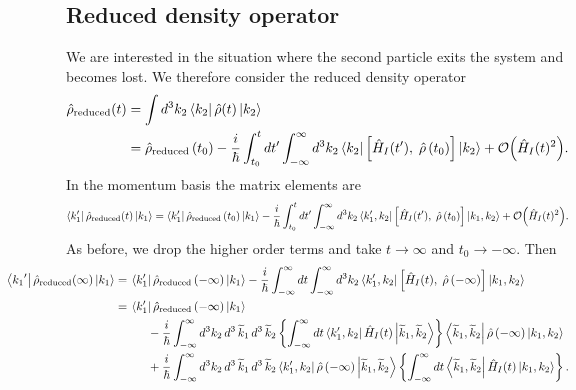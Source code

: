 \subsection{Reduced density operator}

We are interested in the situation where the second particle exits the system and becomes lost. We therefore consider the reduced density operator
\begin{align*}
\hat{\rho}_\text{reduced}(t) &= \int d^3k_2 \left\langle k_2\right| \hat{\rho}(t) \left|k_2\right\rangle \nonumber\\
&= \hat{\rho}_\text{reduced}\left(t_0\right) -  \frac{i}{\hbar} \int_{t_0}^tdt^\prime\int_{-\infty}^\infty d^3k_2\left\langle k_2\right|\left[\hat{H}_I(t^\prime),\; \hat{\rho}\left(t_0\right)\right]\left|k_2\right\rangle + \mathcal{O}{\left(\hat{H}_I(t)^2\right)}.
\end{align*}
In the momentum basis the matrix elements are
\[
\left\langle k_1^\prime\right|\hat{\rho}_\text{reduced}(t)\left|k_1\right\rangle = \left\langle k_1^\prime\right|\hat{\rho}_\text{reduced}\left(t_0\right)\left|k_1\right\rangle -  \frac{i}{\hbar} \int_{t_0}^tdt^\prime\int_{-\infty}^\infty d^3k_2 \left\langle k_1^\prime, k_2\right|\left[\hat{H}_I(t^\prime),\; \hat{\rho}\left(t_0\right)\right]\left|k_1, k_2\right\rangle + \mathcal{O}{\left(\hat{H}_I(t)^2\right)}.
\]
As before, we drop the higher order terms and take \(t \to \infty\) and \(t_0 \to -\infty\). Then
\begin{align*}
\hspace{-5em}\bra{{k_1}^\prime}\op{\rho}_\text{reduced}(\infty)\ket{k_1} =\hspace{1.7em}&\hspace{-1.5em} \bra{k_1^\prime}\op{\rho}_\text{reduced}\left(-\infty\right)\ket{k_1} -  \frac{i}{\hbar} \int_{-\infty}^\infty dt \int_{-\infty}^\infty d^3k_2 \bra{k_1^\prime, k_2}\left[\op{H}_I(t),\; \op{\rho}\left(-\infty\right)\right]\ket{k_1, k_2} 
\\=\hspace{1.7em}&\hspace{-1.5em}
\bra{k_1^\prime}\op{\rho}_\text{reduced}\left(-\infty\right)\ket{k_1}
\\&-  \frac{i}{\hbar} \int_{-\infty}^\infty d^3k_2 \,d^3\,\widetilde{k}_1\,d^3\,\widetilde{k}_2 \left\{\int_{-\infty}^\infty dt \bra{k_1^\prime, k_2}\op{H}_I(t) \ket{\widetilde{k}_1, \widetilde{k}_2}
\right\}\bra{\widetilde{k}_1, \widetilde{k}_2}\op{\rho}\left(-\infty\right)\ket{k_1, k_2}
\\&+  \frac{i}{\hbar} \int_{-\infty}^\infty d^3k_2\,d^3\,\widetilde{k}_1\,d^3\,\widetilde{k}_2 \bra{k_1^\prime, k_2} \op{\rho}\left(-\infty\right)
\ket{\widetilde{k}_1, \widetilde{k}_2}\left\{\int_{-\infty}^\infty dt\bra{\widetilde{k}_1, \widetilde{k}_2}\op{H}_I(t)\ket{k_1, k_2}\right\}.\end{align*}
